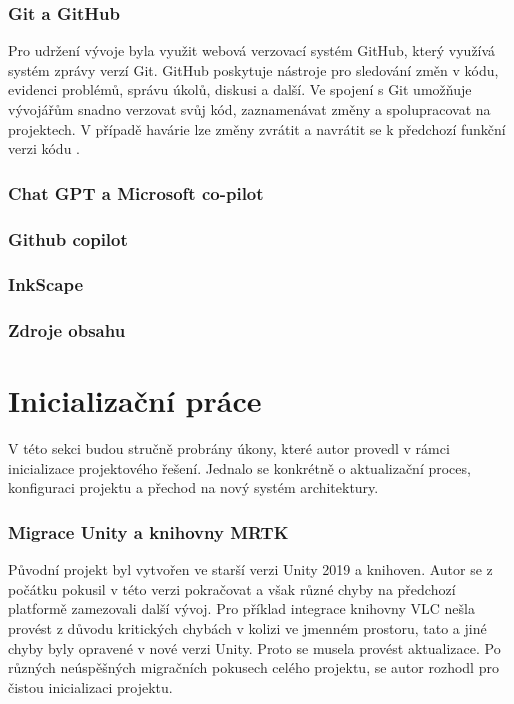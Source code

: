 \subsubsection{Git a GitHub}
Pro udržení vývoje byla využit webová verzovací systém GitHub, který využívá systém zprávy verzí Git. GitHub poskytuje nástroje pro sledování změn v kódu, evidenci problémů, správu úkolů, diskusi a další. Ve spojení s Git umožňuje vývojářům snadno verzovat svůj kód, zaznamenávat změny a spolupracovat na projektech. V případě havárie lze změny zvrátit a navrátit se k předchozí funkční verzi kódu \cite{gitGithub}. 
\subsubsection{Chat GPT a Microsoft co-pilot}

\subsubsection{Github copilot}

\subsubsection{InkScape}

\subsubsection{Zdroje obsahu}
%
%
\newpage
\section{Inicializační práce}
V této sekci budou stručně probrány úkony, které autor provedl v rámci inicializace projektového řešení. Jednalo se konkrétně o aktualizační proces, konfiguraci projektu a přechod na nový systém architektury.
\subsubsection{Migrace Unity a knihovny MRTK}
Původní projekt byl vytvořen ve starší verzi Unity 2019 a knihoven. Autor se z počátku pokusil v této verzi pokračovat a však různé chyby na předchozí platformě zamezovali další vývoj. Pro příklad integrace knihovny VLC nešla provést z důvodu kritických chybách v kolizi ve jmenném prostoru, tato a jiné chyby byly opravené v nové verzi Unity.  Proto se musela provést aktualizace. Po různých neúspěšných migračních pokusech celého projektu, se autor rozhodl pro čistou inicializaci projektu. 

